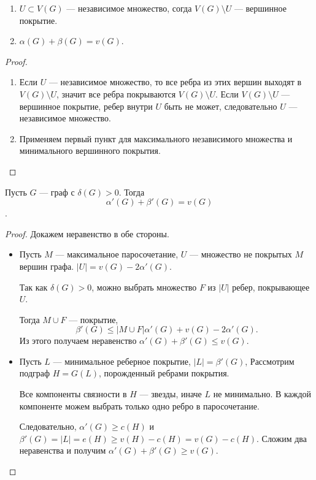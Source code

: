 \begin{lemma}\label{lm:matching_1}
    \begin{enumerate}
		\item $U \subset V(G)$ --- независимое множество, согда $V(G) \setminus U$ --- вершинное покрытие.
		\item $\alpha(G) + \beta(G) = v(G)$.
    \end{enumerate}
\end{lemma}
\begin{proof}
    \begin{enumerate}
		\item Если $U$ --- независимое множество, то все ребра из этих вершин выходят в $V(G) \setminus U$, значит все ребра покрываются $V(G) \setminus U$. Если $V(G) \setminus U$ --- вершинное покрытие, ребер внутри $U$ быть не может, следовательно $U$ --- независимое множество.
		\item Применяем первый пункт для максимального независимого множества и минимального вершинного покрытия.
    \end{enumerate}
\end{proof}

\begin{theorem}[Галлаи, 1959]
	Пусть $G$ --- граф с $\delta(G) > 0$. Тогда $$\alpha'(G) + \beta'(G) = v(G)$$.
\end{theorem}
\begin{proof}
    Докажем неравенство в обе стороны.
	\begin{itemize}
		\item Пусть $M$ --- максимальное паросочетание, $U$ --- множество не покрытых $M$ вершин графа. $\lvert U \rvert = v(G) - 2 \alpha'(G)$.

			Так как $\delta(G) > 0$, можно выбрать множество $F$ из $\lvert U \rvert $ ребер, покрывающее $U$. 

			Тогда $M \cup F$ --- покрытие,
			\[
			\beta'(G) \le \lvert M \cup F \rvert \alpha'(G) + v(G) - 2 \alpha'(G)
			.\] 
			Из этого получаем неравенство $\alpha'(G) + \beta'(G) \le v(G)$.
		\item Пусть $L$ --- минимальное реберное покрытие, $\lvert L \rvert = \beta'(G)$, Рассмотрим подграф $H = G(L)$, порожденный ребрами покрытия.

			Все компоненты связности в $H$ --- звезды, иначе $L$ не минимально. В каждой компоненте можем выбрать только одно ребро в паросочетание.

			Следовательно, $\alpha'(G) \ge c(H)$ и $\beta'(G) = \lvert L \rvert = e(H) \ge v(H) - c(H) = v(G) - c(H)$. Сложим два неравенства и получим $\alpha'(G) + \beta'(G) \ge v(G)$.
	\end{itemize}
\end{proof}
